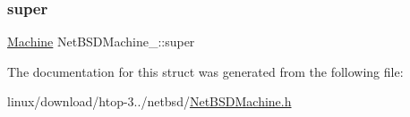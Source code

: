 \subsubsection{\texorpdfstring{super}{super}}
{\footnotesize\ttfamily \hyperlink{Machine_8h_aa3706f95e4706b9d02979efcabb1341d}{Machine} Net\+B\+S\+D\+Machine\+\_\+\+::super}



The documentation for this struct was generated from the following file\+:\begin{DoxyCompactItemize}
\item 
linux/download/htop-\/3../netbsd/\hyperlink{NetBSDMachine_8h}{Net\+B\+S\+D\+Machine.\+h}\end{DoxyCompactItemize}
